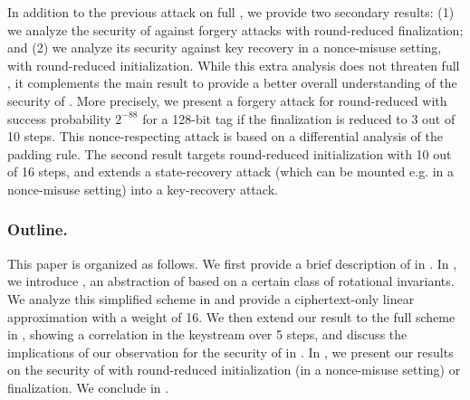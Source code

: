 In addition to the previous attack on full \MORUS, we provide two secondary results: (1) we analyze the security of \MORUS against forgery attacks with round-reduced finalization; and (2) we analyze its security against key recovery in a nonce-misuse setting, with round-reduced initialization.
While this extra analysis does not threaten full \MORUS, it complements the main result to provide a better overall understanding of the security of \MORUS.
More precisely, we present a forgery attack for round-reduced \MORUS[1280] with success probability $2^{-88}$ for a 128-bit tag if the finalization is reduced to 3 out of 10 steps. This nonce-respecting attack is based on a differential analysis of the padding rule.
The second result targets round-reduced initialization with 10 out of 16 steps, and extends a state-recovery attack (which can be mounted e.g. in a nonce-misuse setting) into a key-recovery attack.

\subsubsection*{Outline.}
This paper is organized as follows.
We first provide a brief description of \MORUS in .
In , we introduce \MiniMORUS, an abstraction of \MORUS based on a certain class of rotational invariants.
We analyze this simplified scheme in  and provide a ciphertext-only linear approximation with a weight of 16.
We then extend our result to the full scheme in , showing a correlation in the keystream over 5 steps,
and discuss the implications of our observation for the security of \MORUS in .
In , we present our results on the security of \MORUS with round-reduced initialization (in a nonce-misuse setting) or finalization.
We conclude in .

